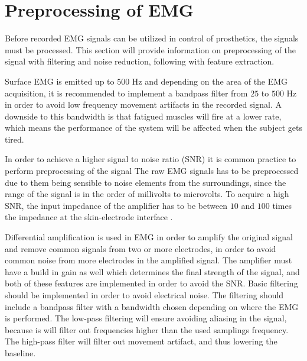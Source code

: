 \section{Preprocessing of EMG}

Before recorded EMG signals can be utilized in control of prosthetics, the signals must be processed. This section will provide information on preprocessing of the signal with filtering and noise reduction, following with feature extraction.

Surface EMG is emitted up to $500$ Hz and depending on the area of the EMG acquisition, it is recommended to implement a bandpass filter from $25$ to $500$ Hz in order to avoid low frequency movement artifacts in the recorded signal. 
A downside to this bandwidth is that fatigued muscles will fire at a lower rate, which means the performance of the system will be affected when the subject gets tired. \cite{cram2012} %

In order to achieve a higher signal to noise ratio (SNR) it is common practice to perform preprocessing of the signal%
The raw EMG signals has to be preprocessed due to them being sensible to noise elements from the surroundings, since the range of the signal is in the order of millivolts to microvolts. To acquire a high SNR, the input impedance of the amplifier has to be between $10$ and $100$ times the impedance at the skin-electrode interface \cite{cram2012}.


Differential amplification is used in EMG in order to amplify the original signal and remove common signals from two or more electrodes, in order to avoid common noise from more electrodes in the amplified signal. The amplifier must have a build in gain as well which determines the final strength of the signal, and both of these features are implemented in order to avoid the SNR. Basic filtering should be implemented in order to avoid electrical noise. 
The filtering should include a bandpass filter with a bandwidth chosen depending on where the EMG is performed. The low-pass filtering will ensure avoiding aliasing in the signal, because is will filter out frequencies higher than the used samplings frequency. The high-pass filter will filter out movement artifact, and thus lowering the baseline. \cite{cram2012}


